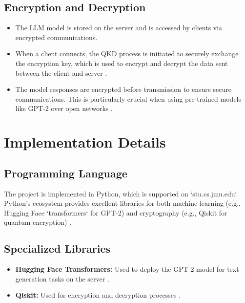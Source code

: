 \documentclass{article}
\begin{document}
\subsection{Encryption and Decryption}
\begin{itemize}
    \item The LLM model is stored on the server and is accessed by clients via encrypted communications.
    \item When a client connects, the QKD process is initiated to securely exchange the encryption key, which is used to encrypt and decrypt the data sent between the client and server \parencite{patel2020, nielsen2010}.
    \item The model responses are encrypted before transmission to ensure secure communications. This is particularly crucial when using pre-trained models like GPT-2 over open networks \parencite{huggingface_gpt2_model_2024, mlabonne_llm_course_2024}.
\end{itemize}

\section{Implementation Details}

\subsection{Programming Language}
The project is implemented in Python, which is supported on `stu.cs.jmu.edu`. Python's ecosystem provides excellent libraries for both machine learning (e.g., Hugging Face `transformers` for GPT-2) and cryptography (e.g., Qiskit for quantum encryption) \parencite{nielsen2010, tanenbaum2020, huggingface_gpt2_model_2024}.

\subsection{Specialized Libraries}
\begin{itemize}
    \item \textbf{Hugging Face Transformers:} Used to deploy the GPT-2 model for text generation tasks on the server \parencite{huggingface_llm_2024, jalammar_gpt2_illustration_2024}.
    \item \textbf{Qiskit:} Used for encryption and decryption processes \parencite{bennett1984, lo2012, nsa2024}.
\end{itemize}





\end{document}
